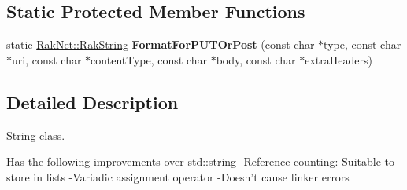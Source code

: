 \subsection*{Static Protected Member Functions}
\begin{DoxyCompactItemize}
\item 
\hypertarget{class_rak_net_1_1_rak_string_a7e946c5d21b5312cd2d9ad7791317464}{static \hyperlink{class_rak_net_1_1_rak_string}{Rak\-Net\-::\-Rak\-String} {\bfseries Format\-For\-P\-U\-T\-Or\-Post} (const char $\ast$type, const char $\ast$uri, const char $\ast$content\-Type, const char $\ast$body, const char $\ast$extra\-Headers)}\label{class_rak_net_1_1_rak_string_a7e946c5d21b5312cd2d9ad7791317464}

\end{DoxyCompactItemize}


\subsection{Detailed Description}
String class. 

Has the following improvements over std\-::string -\/\-Reference counting\-: Suitable to store in lists -\/\-Variadic assignment operator -\/\-Doesn't cause linker errors 

